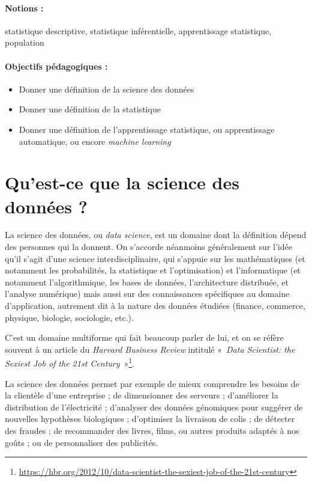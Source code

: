 \label{chap:intro}

\paragraph{Notions :} statistique descriptive, statistique inférentielle,
apprentissage statistique, population

\paragraph{Objectifs pédagogiques :}
\begin{itemize}
	\item Donner une définition de la science des données
	\item Donner une définition de la statistique 
	\item Donner une définition de l'apprentissage statistique, ou apprentissage
	automatique, ou encore \textit{machine learning}
\end{itemize}



\section{Qu'est-ce que la science des données ?}
La science des données, ou \textit{data science}, est un domaine dont la
définition dépend des personnes qui la donnent. On s'accorde néanmoins
généralement sur l'idée qu'il s'agit d'une science interdisciplinaire, qui
s'appuie sur les mathématiques (et notamment les probabilités, la statistique
et l'optimisation) et l'informatique (et notamment l'algorithmique, les bases
de données, l'architecture distribuée, et l'analyse numérique) mais aussi sur
des connaissances spécifiques au domaine d'application, autrement dit à la
nature des données étudiées (finance, commerce, physique, biologie, sociologie,
etc.).

C'est un domaine multiforme qui fait beaucoup parler de lui, et on se réfère
souvent à un article du \textit{Harvard Business Review} intitulé «~\textit{Data Scientist: the Sexiest Job of the 21st Century}~»\footnote{\href{https://hbr.org/2012/10/data-scientist-the-sexiest-job-of-the-21st-century}{https://hbr.org/2012/10/data-scientist-the-sexiest-job-of-the-21st-century}}.

La science des données permet par exemple de mieux comprendre les besoins de la
clientèle d'une entreprise ; de dimensionner des serveurs ; d'améliorer la
distribution de l'électricité ; d'analyser des données génomiques pour suggérer
de nouvelles hypothèses biologiques ; d'optimiser la livraison de colis ; de
détecter des fraudes ; de recommander des livres, films, ou autres produits
adaptés à nos goûts ; ou de personnaliser des publicités.

